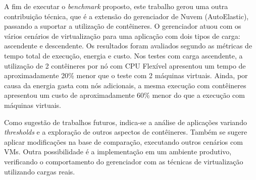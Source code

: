 \documentclass[twoside,english,brazilian]{UNISINOSartigo}
\begin{document}
A fim de executar o \textit{benchmark} proposto, este trabalho gerou uma outra contribuição técnica, que é a extensão do gerenciador de Nuvem (AutoElastic), passando a suportar a utilização de contêineres. O gerenciador atuou com os vários cenários de virtualização para uma aplicação com dois tipos de carga: ascendente e descendente. Os resultados foram avaliados segundo as métricas de tempo total de execução, energia e custo. Nos testes com carga ascendente, a utilização de 2 contêineres por nó com CPU Flexível apresentou um tempo de aproximadamente 20\% menor que o teste com 2 máquinas virtuais. Ainda, por causa da energia gasta com nós adicionais, a mesma execução com contêineres apresentou um custo de aproximadamente 60\% menor do que a execução com máquinas virtuais. 

Como sugestão de trabalhos futuros, indica-se a análise de aplicações variando \textit{thresholds} e a exploração de outros aspectos de contêineres. Também se sugere aplicar modificações na base de comparação, executando outros cenários com VMs. Outra possibilidade é a implementação em um ambiente produtivo, verificando o comportamento do gerenciador com as técnicas de virtualização utilizando cargas reais. 

\end{document}
